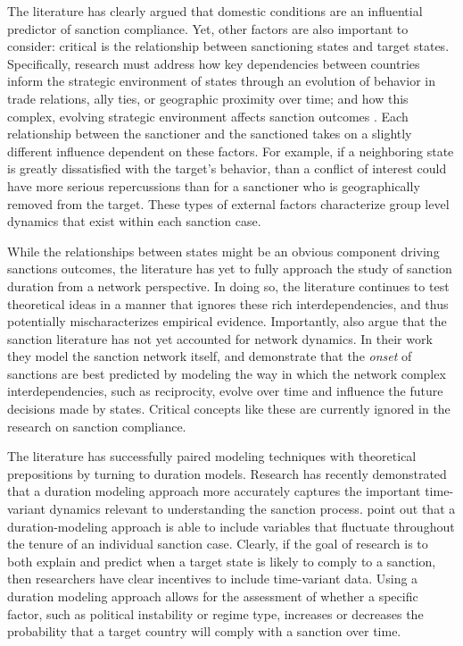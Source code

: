 
The literature has clearly argued that domestic conditions are an influential predictor of sanction compliance. Yet, other factors are also important to consider: critical is the relationship between sanctioning states and target states. Specifically, research must address how key dependencies between countries inform the strategic environment of states through an evolution of behavior in trade relations, ally ties, or geographic proximity over time; and how this complex, evolving strategic environment affects sanction outcomes \citep{mclean2010friends}. Each relationship between the sanctioner and the sanctioned takes on a slightly different influence dependent on these factors. For example, if a neighboring state is greatly dissatisfied with the target's behavior, than a conflict of interest could have more serious repercussions than for a sanctioner who is geographically removed from the target. These types of external factors characterize group level dynamics that exist within each sanction case. 

While the relationships between states might be an obvious component driving sanctions outcomes, the literature has yet to fully approach the study of sanction duration from a network perspective. In doing so, the literature continues to test theoretical ideas in a manner that ignores these rich interdependencies, and thus potentially mischaracterizes empirical evidence. Importantly, \citet{cranmer2014reciprocity} also argue that the sanction literature has not yet accounted for network dynamics. In their work they model the sanction network itself, and demonstrate that the \textit{onset} of sanctions are best predicted by modeling the way in which the network complex interdependencies, such as reciprocity, evolve over time and influence the future decisions made by states. Critical concepts like these are currently ignored in the research on sanction compliance. 

The literature has successfully paired modeling techniques with theoretical prepositions by turning to duration models. Research has recently demonstrated that a duration modeling approach more accurately captures the important time-variant dynamics relevant to understanding the sanction process. \cite{bolks2000} point out that a duration-modeling approach is able to include variables that fluctuate throughout the tenure of an individual sanction case. Clearly, if the goal of research is to both explain and predict when a target state is likely to comply to a sanction, then researchers have clear incentives to include time-variant data. Using a duration modeling approach allows for the assessment of whether a specific factor, such as political instability or regime type, increases or decreases the probability that a target country will comply with a sanction over time.

